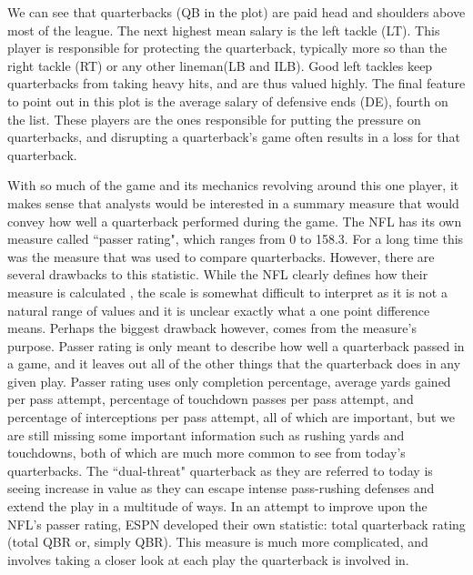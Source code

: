 \documentclass[12pt]{article}\usepackage[]{graphicx}\usepackage[]{color}
\begin{document}
\newpage
We can see that quarterbacks (QB in the plot) are paid head and shoulders above most of the league. The next highest mean salary is the left tackle (LT). This player is responsible for protecting the quarterback, typically more so than the right tackle (RT) or any other lineman(LB and ILB). Good left tackles keep quarterbacks from taking heavy hits, and are thus valued highly. The final feature to point out in this plot is the average salary of defensive ends (DE), fourth on the list. These players are the ones responsible for putting the pressure on quarterbacks, and disrupting a quarterback's game often results in a loss for that quarterback. 

With so much of the game and its mechanics revolving around this one player, it makes sense that analysts would be interested in a summary measure that would convey how well a quarterback performed during the game. The NFL has its own measure called ``passer rating", which ranges from 0 to 158.3. For a long time this was the measure that was used to compare quarterbacks. However, there are several drawbacks to this statistic. While the NFL clearly defines how their measure is calculated \cite{passer}, the scale is somewhat difficult to interpret as it is not a natural range of values and it is unclear exactly what a one point difference means. Perhaps the biggest drawback however, comes from the measure's purpose. Passer rating is only meant to describe how well a quarterback passed in a game, and it leaves out all of the other things that the quarterback does in any given play. Passer rating uses only completion percentage, average yards gained per pass attempt, percentage of touchdown passes per pass attempt, and percentage of interceptions per pass attempt, all of which are important, but we are still missing some important information such as rushing yards and touchdowns, both of which are much more common to see from today's quarterbacks. The ``dual-threat" quarterback as they are referred to today is seeing increase in value as they can escape intense pass-rushing defenses and extend the play in a multitude of ways. In an attempt to improve upon the NFL's passer rating, ESPN developed their own statistic: total quarterback rating (total QBR or, simply QBR). This measure is much more complicated, and involves taking a closer look at each play the quarterback is involved in.
\end{document}
